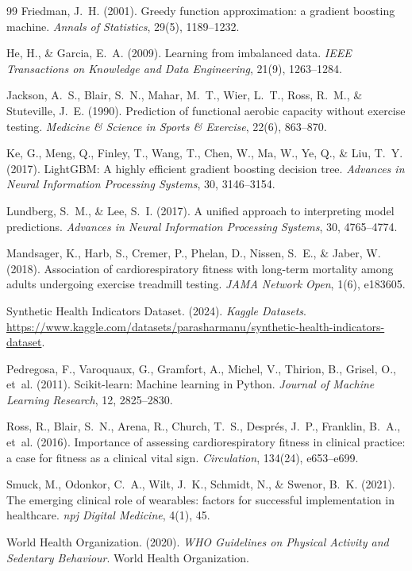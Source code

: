 \documentclass[11pt,a4paper]{article}
\begin{document}
\begin{thebibliography}{99}
Friedman, J.~H. (2001). Greedy function approximation: a gradient boosting machine. \emph{Annals of Statistics}, 29(5), 1189--1232.

He, H., \& Garcia, E.~A. (2009). Learning from imbalanced data. \emph{IEEE Transactions on Knowledge and Data Engineering}, 21(9), 1263--1284.

Jackson, A.~S., Blair, S.~N., Mahar, M.~T., Wier, L.~T., Ross, R.~M., \& Stuteville, J.~E. (1990). Prediction of functional aerobic capacity without exercise testing. \emph{Medicine \& Science in Sports \& Exercise}, 22(6), 863--870.

Ke, G., Meng, Q., Finley, T., Wang, T., Chen, W., Ma, W., Ye, Q., \& Liu, T.~Y. (2017). LightGBM: A highly efficient gradient boosting decision tree. \emph{Advances in Neural Information Processing Systems}, 30, 3146--3154.

Lundberg, S.~M., \& Lee, S.~I. (2017). A unified approach to interpreting model predictions. \emph{Advances in Neural Information Processing Systems}, 30, 4765--4774.

Mandsager, K., Harb, S., Cremer, P., Phelan, D., Nissen, S.~E., \& Jaber, W. (2018). Association of cardiorespiratory fitness with long-term mortality among adults undergoing exercise treadmill testing. \emph{JAMA Network Open}, 1(6), e183605.

Synthetic Health Indicators Dataset. (2024). \emph{Kaggle Datasets}. \url{https://www.kaggle.com/datasets/parasharmanu/synthetic-health-indicators-dataset}.

Pedregosa, F., Varoquaux, G., Gramfort, A., Michel, V., Thirion, B., Grisel, O., et~al. (2011). Scikit-learn: Machine learning in Python. \emph{Journal of Machine Learning Research}, 12, 2825--2830.

Ross, R., Blair, S.~N., Arena, R., Church, T.~S., Despr{\'e}s, J.~P., Franklin, B.~A., et~al. (2016). Importance of assessing cardiorespiratory fitness in clinical practice: a case for fitness as a clinical vital sign. \emph{Circulation}, 134(24), e653--e699.

Smuck, M., Odonkor, C.~A., Wilt, J.~K., Schmidt, N., \& Swenor, B.~K. (2021). The emerging clinical role of wearables: factors for successful implementation in healthcare. \emph{npj Digital Medicine}, 4(1), 45.

World Health Organization. (2020). \emph{WHO Guidelines on Physical Activity and Sedentary Behaviour}. World Health Organization.
\end{thebibliography}
\end{document}
